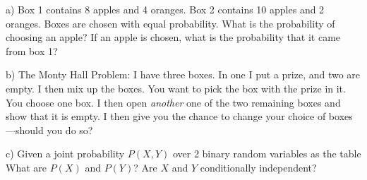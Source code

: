 

\renewcommand{\course}{Robotics}
\renewcommand{\coursepicture}{roboticsLecture}
\renewcommand{\coursedate}{Winter 2014}
\renewcommand{\exnum}{8}

\exercises


\exercisestitle



a) Box 1 contains 8 apples and 4 oranges. Box 2 contains 10 apples and 2
oranges. Boxes are chosen with equal probability. What is the
probability of choosing an apple? If an apple is chosen, what is the
probability that it came from box 1?

b) The Monty Hall Problem: I have three boxes. In one I put a prize,
and two are empty. I then mix up the boxes. You want to pick the box
with the prize in it. You choose one box. I then open \emph{another}
one of the two remaining boxes and show that it is empty. I then give
you the chance to change your choice of boxes---should you do so?

c) Given a joint probability $P(X,Y)$ over 2 binary random variables
as the table\\
What are $P(X)$ and $P(Y)$? Are $X$ and $Y$ conditionally independent?



